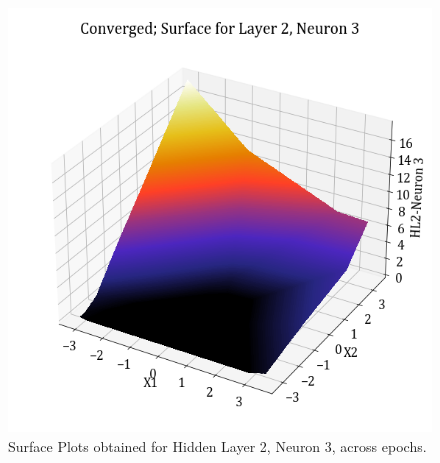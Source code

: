 \documentclass[11pt,a4paper]{article}
\begin{document}
\begin{figure}[H]
    \includegraphics[scale=0.4]{images/1B_MLFFNN_conv_HL2_N3.png}
    \caption{Surface Plots obtained for Hidden Layer 2, Neuron 3, across epochs.}
\end{figure}
\end{document}
